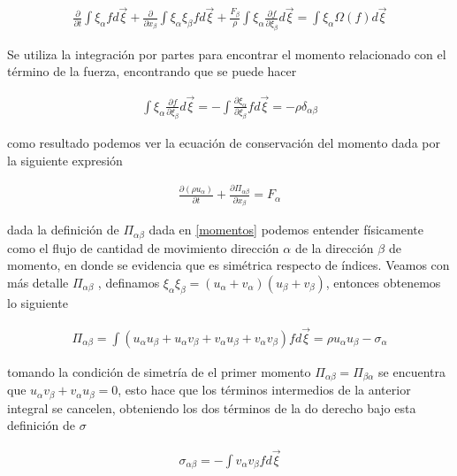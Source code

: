 \begin{eqnarray}
\frac{\partial}{\partial t}\int \xi_{\alpha}f d\vec{\xi}+\frac{\partial}{\partial x_{\beta}}\int \xi_{\alpha}\xi_{\beta}fd\vec{\xi}+\frac{F_{\beta}}{\rho}\int \xi_{\alpha}\frac{\partial f}{\partial \xi_{\beta}}d\vec{\xi} = \int \xi_{\alpha}\Omega(f)d\vec{\xi}
\end{eqnarray}

\noindent Se utiliza la integración por partes para encontrar el momento relacionado con el término de la fuerza, encontrando que se puede hacer 

\begin{eqnarray}
\int \xi_{\alpha}\frac{\partial f}{\partial \xi_{\beta}}d\vec{\xi} = -\int \frac{\partial \xi_{\alpha}}{\partial \xi_{\beta}}fd\vec{\xi}= -\rho\delta_{\alpha\beta}
\end{eqnarray}

\noindent como resultado podemos ver la ecuación de conservación del momento dada por la siguiente expresión 

\begin{eqnarray}
\frac{\partial (\rho u_{\alpha})}{\partial t}+\frac{\partial \Pi_{\alpha\beta}}{\partial x_{\beta}} = F_{\alpha}
\end{eqnarray}

\noindent dada la definición de $\Pi_{\alpha\beta}$ dada en \eqref{momentos} podemos entender físicamente como el flujo de cantidad de movimiento dirección $\alpha$ de la dirección $\beta$ de momento, en donde se evidencia que es simétrica respecto de índices. Veamos con más detalle $\Pi_{\alpha\beta}$ , definamos $\xi_{\alpha}\xi_{\beta}=(u_{\alpha}+v_{\alpha})(u_{\beta}+v_{\beta})$, entonces obtenemos lo siguiente 

\begin{eqnarray}
\Pi_{\alpha\beta} = \int (u_{\alpha}u_{\beta}+u_{\alpha}v_{\beta}+v_{\alpha}u_{\beta}+v_{\alpha}v_{\beta})fd\vec{\xi} = \rho u_{\alpha}u_{\beta} -\sigma_{\alpha}
\end{eqnarray}

\noindent tomando la condición de simetría de el primer momento $\Pi_{\alpha\beta}=\Pi_{\beta\alpha}$ se encuentra  que $u_{\alpha}v_{\beta} + v_{\alpha}u_{\beta}=0$, esto hace que los términos intermedios de la anterior integral se cancelen, obteniendo los dos términos de la do derecho bajo esta definición de $\sigma$

\begin{eqnarray}
\sigma_{\alpha\beta} = - \int v_{\alpha}v_{\beta}fd\vec{\xi}
\end{eqnarray}

